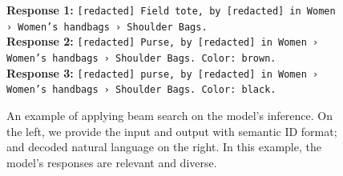 \documentclass[]{fairmeta}
\begin{document}
\begin{figure}[H]
\begin{tcolorbox}[title={\textbf{Case Study: Beam Search}},
                    colback=white, colframe=black!70]
\begin{minipage}[t]{0.48\textwidth}
  \textbf{Response 1:} {\footnotesize\texttt{[redacted] Field tote, by [redacted] in Women › Women's handbags › Shoulder Bags.}}\\
  \textbf{Response 2:} {\footnotesize\texttt{[redacted] Purse, by [redacted] in Women › Women's handbags › Shoulder Bags. Color: brown.}}\\
  \textbf{Response 3:} {\footnotesize\texttt{[redacted] purse, by [redacted] in Women › Women's handbags › Shoulder Bags. Color: black.}}\\
  \end{minipage}
  \end{tcolorbox}
  \caption{An example of applying beam search on the model's inference. On the left, we provide the input and output with semantic ID format; and decoded natural language on the right. In this example, the model's responses are relevant and diverse.}\label{case:beam_search}
  \end{figure}
\end{document}
